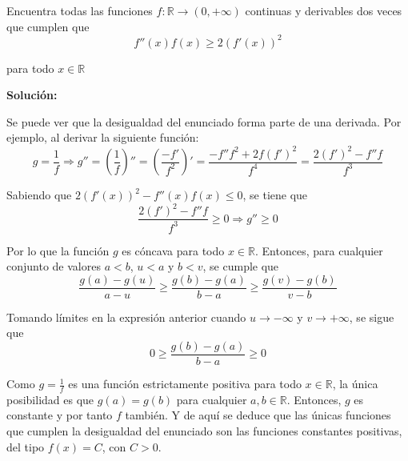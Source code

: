 \documentclass[../../main.tex]{subfiles}
\begin{document}
  \begin{shaded}
    Encuentra todas las funciones $f: \mathbb{R} \to (0, + \infty)$ continuas y derivables dos veces que cumplen que
    $$
    f''(x) f(x) \geqslant 2 (f'(x))^2
    $$

    para todo $x \in \mathbb{R}$
  \end{shaded}

  \textbf{Solución:}

  Se puede ver que la desigualdad del enunciado forma parte de una derivada. Por ejemplo, al derivar la siguiente función:
  $$
  g = \frac{1}{f} \Longrightarrow g'' = \left(\frac{1}{f}\right)'' = \left(\frac{-f'}{f^2}\right)' = \frac{-f'' f^2 + 2 f (f')^2}{f^4} = \frac{2 (f')^2 -f'' f}{f^3}
  $$

  Sabiendo que $ 2 (f'(x))^2 - f''(x) f(x) \leqslant 0$, se tiene que
  $$
  \frac{2 (f')^2 -f'' f}{f^3} \geqslant 0 \Longrightarrow g'' \geqslant 0
  $$

  Por lo que la función $g$ es cóncava para todo $x \in \mathbb{R}$. Entonces, para cualquier conjunto de valores $a < b$, $u < a$ y $b < v$, se cumple que
  $$
  \frac{g(a) - g(u)}{a - u} \geqslant \frac{g(b) - g(a)}{b - a} \geqslant \frac{g(v) - g(b)}{v - b}
  $$

  Tomando límites en la expresión anterior cuando $u \to - \infty$ y $v \to + \infty$, se sigue que
  $$
  0 \geqslant \frac{g(b) - g(a)}{b - a} \geqslant 0
  $$

  Como $g = \displaystyle\frac{1}{f}$ es una función estrictamente positiva para todo $x \in \mathbb{R}$, la única posibilidad es que $g(a) = g(b)$ para cualquier $a, b \in \mathbb{R}$. Entonces, $g$ es constante y por tanto $f$ también. Y de aquí se deduce que las únicas funciones que cumplen la desigualdad del enunciado son las funciones constantes positivas, del tipo $f(x) = C$, con $C > 0$.
\end{document}
